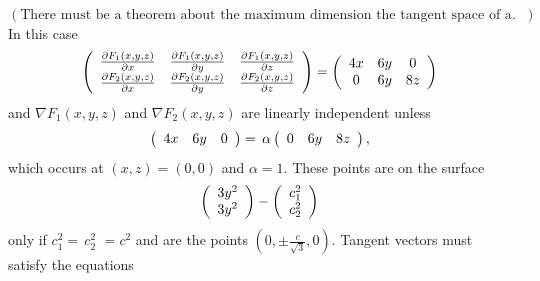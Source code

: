 \documentclass[aps,preprint]{revtex4}%
\begin{document}
$\left(  \text{There must be a theorem about the maximum dimension the tangent
space of a surface can be}\right)  .$ In this case
\begin{equation}
\left(
\begin{array}
[c]{ccc}%
\frac{\partial F_{1}\left(  x,y,z\right)  }{\partial x} & \frac{\partial
F_{1}\left(  x,y,z\right)  }{\partial y} & \frac{\partial F_{1}\left(
x,y,z\right)  }{\partial z}\\
\frac{\partial F_{2}\left(  x,y,z\right)  }{\partial x} & \frac{\partial
F_{2}\left(  x,y,z\right)  }{\partial y} & \frac{\partial F_{2}\left(
x,y,z\right)  }{\partial z}%
\end{array}
\right)  =\left(
\begin{array}
[c]{ccc}%
4x & 6y & 0\\
0 & 6y & 8z
\end{array}
\right)
\end{equation}
and $\nabla F_{1}\left(  x,y,z\right)  $ and $\nabla F_{2}\left(
x,y,z\right)  $ are linearly independent unless
\begin{equation}
\left(
\begin{array}
[c]{ccc}%
4x & 6y & 0
\end{array}
\right)  =\,\alpha\left(
\begin{array}
[c]{ccc}%
0 & 6y & 8z
\end{array}
\right)  ,
\end{equation}
which occurs at $\left(  x,z\right)  =\left(  0,0\right)  $ and $\alpha=1.$
These points are on the surface
\begin{equation}
\left(
\begin{array}
[c]{c}%
3y^{2}\\
3y^{2}%
\end{array}
\right)  -\left(
\begin{array}
[c]{c}%
c_{1}^{2}\\
c_{2}^{2}%
\end{array}
\right)
\end{equation}
only if $c_{1}^{2}=\,c_{2}^{2}$ $=c^{2}$ and are the points $\left(
0,\pm\frac{c}{\sqrt{3}},0\right)  .$ Tangent vectors must satisfy the equations%
\end{document}
